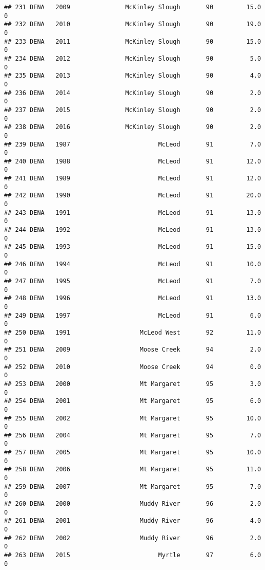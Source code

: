 \documentclass[
]{article}
\begin{document}
\begin{verbatim}
## 231 DENA   2009               McKinley Slough       90         15.0       0
## 232 DENA   2010               McKinley Slough       90         19.0       0
## 233 DENA   2011               McKinley Slough       90         15.0       0
## 234 DENA   2012               McKinley Slough       90          5.0       0
## 235 DENA   2013               McKinley Slough       90          4.0       0
## 236 DENA   2014               McKinley Slough       90          2.0       0
## 237 DENA   2015               McKinley Slough       90          2.0       0
## 238 DENA   2016               McKinley Slough       90          2.0       0
## 239 DENA   1987                        McLeod       91          7.0       0
## 240 DENA   1988                        McLeod       91         12.0       0
## 241 DENA   1989                        McLeod       91         12.0       0
## 242 DENA   1990                        McLeod       91         20.0       0
## 243 DENA   1991                        McLeod       91         13.0       0
## 244 DENA   1992                        McLeod       91         13.0       0
## 245 DENA   1993                        McLeod       91         15.0       0
## 246 DENA   1994                        McLeod       91         10.0       0
## 247 DENA   1995                        McLeod       91          7.0       0
## 248 DENA   1996                        McLeod       91         13.0       0
## 249 DENA   1997                        McLeod       91          6.0       0
## 250 DENA   1991                   McLeod West       92         11.0       0
## 251 DENA   2009                   Moose Creek       94          2.0       0
## 252 DENA   2010                   Moose Creek       94          0.0       0
## 253 DENA   2000                   Mt Margaret       95          3.0       0
## 254 DENA   2001                   Mt Margaret       95          6.0       0
## 255 DENA   2002                   Mt Margaret       95         10.0       0
## 256 DENA   2004                   Mt Margaret       95          7.0       0
## 257 DENA   2005                   Mt Margaret       95         10.0       0
## 258 DENA   2006                   Mt Margaret       95         11.0       0
## 259 DENA   2007                   Mt Margaret       95          7.0       0
## 260 DENA   2000                   Muddy River       96          2.0       0
## 261 DENA   2001                   Muddy River       96          4.0       0
## 262 DENA   2002                   Muddy River       96          2.0       0
## 263 DENA   2015                        Myrtle       97          6.0       0

\end{verbatim}
\end{document}
